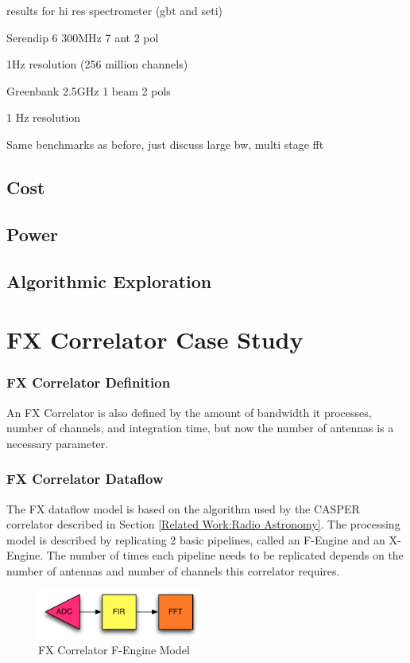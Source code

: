 results for hi res spectrometer (gbt and seti)

Serendip 6 300MHz 7 ant 2 pol

1Hz resolution (256 million channels)

Greenbank 2.5GHz 1 beam 2 pols

1 Hz resolution

Same benchmarks as before, just discuss large bw, multi stage fft
\subsection{Cost}
\subsection{Power}
\subsection{Algorithmic Exploration}

\section{FX Correlator Case Study}
\subsubsection{FX Correlator Definition}
An FX Correlator is also defined by the amount of bandwidth it processes, number of channels, and integration time, but now the number of antennas is a necessary parameter.

\subsubsection{FX Correlator Dataflow}

The FX dataflow model is based on the algorithm used by the CASPER correlator described in Section \ref{Related Work:Radio Astronomy}. The processing model is described by replicating 2 basic pipelines, called an F-Engine and an X-Engine. The number of times each pipeline needs to be replicated depends on the number of antennas and number of channels this correlator requires.

\begin{figure}[h!]
  \centering
    \includegraphics[width=0.48\textwidth]{Images/C4/fx_f_engine.pdf}
  \caption{FX Correlator F-Engine Model}
  \label{fig: C4/fx_f_engine.pdf}
\end{figure}

